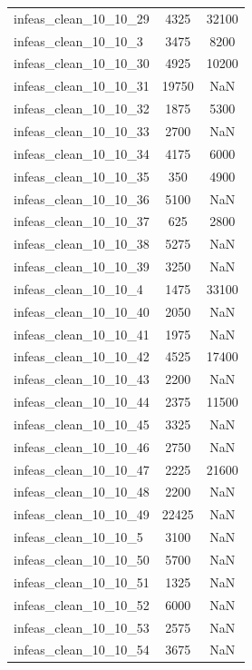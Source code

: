 \begin{longtable}{lcc}
infeas\_clean\_10\_10\_29  &     4325 &  32100 \\
infeas\_clean\_10\_10\_3   &     3475 &   8200 \\
infeas\_clean\_10\_10\_30  &     4925 &  10200 \\
infeas\_clean\_10\_10\_31  &    19750 &    NaN \\
infeas\_clean\_10\_10\_32  &     1875 &   5300 \\
infeas\_clean\_10\_10\_33  &     2700 &    NaN \\
infeas\_clean\_10\_10\_34  &     4175 &   6000 \\
infeas\_clean\_10\_10\_35  &      350 &   4900 \\
infeas\_clean\_10\_10\_36  &     5100 &    NaN \\
infeas\_clean\_10\_10\_37  &      625 &   2800 \\
infeas\_clean\_10\_10\_38  &     5275 &    NaN \\
infeas\_clean\_10\_10\_39  &     3250 &    NaN \\
infeas\_clean\_10\_10\_4   &     1475 &  33100 \\
infeas\_clean\_10\_10\_40  &     2050 &    NaN \\
infeas\_clean\_10\_10\_41  &     1975 &    NaN \\
infeas\_clean\_10\_10\_42  &     4525 &  17400 \\
infeas\_clean\_10\_10\_43  &     2200 &    NaN \\
infeas\_clean\_10\_10\_44  &     2375 &  11500 \\
infeas\_clean\_10\_10\_45  &     3325 &    NaN \\
infeas\_clean\_10\_10\_46  &     2750 &    NaN \\
infeas\_clean\_10\_10\_47  &     2225 &  21600 \\
infeas\_clean\_10\_10\_48  &     2200 &    NaN \\
infeas\_clean\_10\_10\_49  &    22425 &    NaN \\
infeas\_clean\_10\_10\_5   &     3100 &    NaN \\
infeas\_clean\_10\_10\_50  &     5700 &    NaN \\
infeas\_clean\_10\_10\_51  &     1325 &    NaN \\
infeas\_clean\_10\_10\_52  &     6000 &    NaN \\
infeas\_clean\_10\_10\_53  &     2575 &    NaN \\
infeas\_clean\_10\_10\_54  &     3675 &    NaN \\

\end{longtable}
